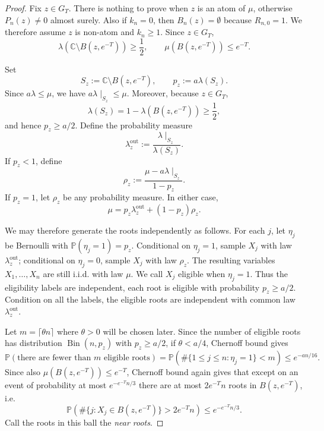 \documentclass[10pt,a4paper]{amsart}
\newcommand{\C}{\mathbb C}
\newcommand{\Prob}{\mathbb P}
\begin{document}
\begin{proof}
    Fix $z\in G_T$. There is nothing to prove when $z$ is an atom of $\mu$, otherwise $P_n(z)\neq 0$ almost surely. Also if $k_n=0$, then $B_n(z)=\emptyset$ because $R_{n,0}=1$. We therefore assume $z$ is non-atom and $k_n\ge 1$. Since $z\in G_T$,
    \[\lambda(\C\setminus B(z,e^{-T}))\ge\frac{1}{2},
    \qquad \mu(B(z,e^{-T}))\le e^{-T}.\]

    Set 
    \[S_z:=\C\setminus B(z,e^{-T}),\qquad p_z:=a\lambda(S_z).\]
    Since $a\lambda\le \mu$, we have $a\lambda\mid_{S_z}\le \mu$. Moreover, because $z\in G_T$, 
    \[\lambda(S_z)=1-\lambda(B(z,e^{-T}))\ge \frac{1}{2},\]
    and hence $p_z\ge a/2$. Define the probability measure 
    \[\lambda_z^{\mathrm{out}}:=\frac{\lambda\mid_{S_z}}{\lambda(S_z)}.\]
    If $p_z<1$, define 
    \[\rho_z:=\frac{\mu-a\lambda\mid_{S_z}}{1-p_z}.\]
    If $p_z=1$, let $\rho_z$ be any probability measure. In either case,
    \[\mu=p_z\lambda_z^{\mathrm{out}}+(1-p_z)\rho_z.\]

    We may therefore generate the roots independently as follows. For each $j$, let $\eta_j$ be Bernoulli with $\Prob(\eta_j=1)=p_z$. Conditional on $\eta_j=1$, sample $X_j$ with law $\lambda_z^{\mathrm{out}}$; conditional on $\eta_j=0$, sample $X_j$ with law $\rho_z$. The resulting variables $X_1,\ldots, X_n$ are still i.i.d. with law $\mu$. We call $X_j$ eligible when $\eta_j=1$. Thus the eligibility labels are independent, each root is eligible with probability $p_z\ge a/2$. Condition on all the labels, the eligible roots are independent with common law $\lambda_z^{\mathrm{out}}$.
    
    Let $m=\lceil \theta n\rceil$ where $\theta>0$ will be chosen later. Since the number of eligible roots has distribution $\operatorname{Bin}(n,p_z)$ with $p_z\ge a/2$, if $\theta<a/4$, Chernoff bound gives 
    \[\Prob(\text{there are fewer than }m\text{ eligible roots})=\Prob(\#\{1\le j\le n:\eta_j=1\}<m)\le e^{-an/16}.\]
    Since also $\mu(B(z,e^{-T}))\le e^{-T}$, Chernoff bound again gives that except on an event of probability at most $e^{-e^{-T}n/3}$ there are at most $2e^{-T}n$ roots in $B(z,e^{-T})$, i.e.
    \[\Prob(\#\{j:X_j\in B(z,e^{-T})\}>2e^{-T}n)\le e^{-e^{-T}n/3}.\]
    Call the roots in this ball the \emph{near roots}.
    

\end{proof}
\end{document}
